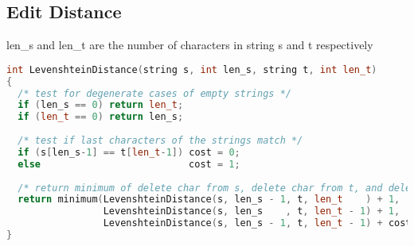 \documentclass[10pt,a4paper]{article}
\begin{document}
\subsection*{Edit Distance}
len\_s and len\_t are the number of characters in string s and t respectively

\begin{lstlisting}[language=C++]
int LevenshteinDistance(string s, int len_s, string t, int len_t)
{
  /* test for degenerate cases of empty strings */
  if (len_s == 0) return len_t;
  if (len_t == 0) return len_s;
 
  /* test if last characters of the strings match */
  if (s[len_s-1] == t[len_t-1]) cost = 0;
  else                          cost = 1;
 
  /* return minimum of delete char from s, delete char from t, and delete char from both */
  return minimum(LevenshteinDistance(s, len_s - 1, t, len_t    ) + 1,
                 LevenshteinDistance(s, len_s    , t, len_t - 1) + 1,
                 LevenshteinDistance(s, len_s - 1, t, len_t - 1) + cost);
}
\end{lstlisting}
\end{document}

